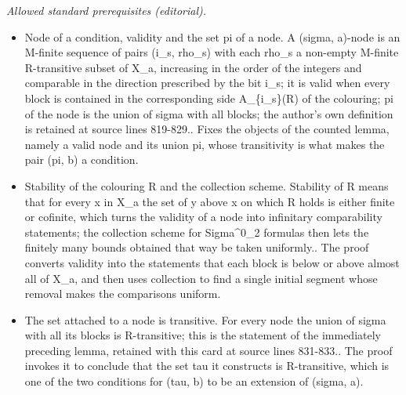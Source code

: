 \documentclass{article}
\numberwithin{theorem}{section}
\begin{document}
\noindent\textit{Allowed standard prerequisites (editorial).}\begin{itemize}
\item Node of a condition, validity and the set pi of a node. A (sigma, a)-node is an M-finite sequence of pairs (i\_s, rho\_s) with each rho\_s a non-empty M-finite R-transitive subset of X\_a, increasing in the order of the integers and comparable in the direction prescribed by the bit i\_s; it is valid when every block is contained in the corresponding side A\_\{i\_s\}(R) of the colouring; pi of the node is the union of sigma with all blocks; the author's own definition is retained at source lines 819-829.. Fixes the objects of the counted lemma, namely a valid node and its union pi, whose transitivity is what makes the pair (pi, b) a condition.
\item Stability of the colouring R and the collection scheme. Stability of R means that for every x in X\_a the set of y above x on which R holds is either finite or cofinite, which turns the validity of a node into infinitary comparability statements; the collection scheme for Sigma\textasciicircum{}0\_2 formulas then lets the finitely many bounds obtained that way be taken uniformly.. The proof converts validity into the statements that each block is below or above almost all of X\_a, and then uses collection to find a single initial segment whose removal makes the comparisons uniform.
\item The set attached to a node is transitive. For every node the union of sigma with all its blocks is R-transitive; this is the statement of the immediately preceding lemma, retained with this card at source lines 831-833.. The proof invokes it to conclude that the set tau it constructs is R-transitive, which is one of the two conditions for (tau, b) to be an extension of (sigma, a).
\end{itemize}\medskip
\end{document}
